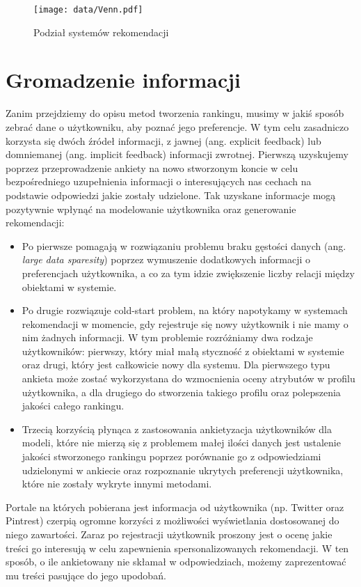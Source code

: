 \begin{figure}[h]
    \centering
    \texttt{[image: data/Venn.pdf]}
    \caption{Podział systemów rekomendacji}
    \label{fig:my_label}
\end{figure}

\section{Gromadzenie informacji}

Zanim przejdziemy do opisu metod tworzenia rankingu, musimy w jakiś sposób zebrać dane o użytkowniku, aby poznać jego preferencje. W tym celu zasadniczo korzysta się dwóch źródeł informacji, z jawnej (ang. explicit feedback) lub domniemanej  (ang. implicit feedback) informacji zwrotnej. Pierwszą uzyskujemy poprzez przeprowadzenie ankiety na nowo stworzonym koncie w celu bezpośredniego uzupełnienia informacji o interesujących nas cechach na podstawie odpowiedzi jakie zostały udzielone. Tak uzyskane informacje mogą pozytywnie wpłynąć na modelowanie użytkownika oraz generowanie rekomendacji:
\begin{itemize}
    \item Po pierwsze pomagają w rozwiązaniu problemu braku gęstości danych (ang. \textit{large data sparesity}) poprzez wymuszenie dodatkowych informacji o preferencjach użytkownika, a co za tym idzie zwiększenie liczby relacji między obiektami w systemie.
    \item Po drugie rozwiązuje cold-start problem, na który napotykamy w systemach rekomendacji w momencie, gdy rejestruje się nowy użytkownik i nie mamy o nim żadnych informacji. W tym problemie rozróżniamy dwa rodzaje użytkowników: pierwszy, który miał małą styczność z obiektami w systemie oraz drugi, który jest całkowicie nowy dla systemu. Dla pierwszego typu ankieta może zostać wykorzystana do wzmocnienia oceny atrybutów w profilu użytkownika, a dla drugiego do stworzenia takiego profilu oraz polepszenia jakości całego rankingu.
    \item Trzecią korzyścią płynąca z zastosowania ankietyzacja użytkowników dla modeli, które nie mierzą się z problemem małej ilości danych jest ustalenie jakości stworzonego rankingu poprzez porównanie go z odpowiedziami udzielonymi w ankiecie oraz rozpoznanie ukrytych preferencji użytkownika, które nie zostały wykryte innymi metodami. \cite{RecommenderSystemsBasedonUserReviews:TheStateoftheArt}
\end{itemize}

Portale na których pobierana jest informacja od użytkownika (np. Twitter oraz Pintrest) czerpią ogromne korzyści z możliwości wyświetlania dostosowanej do niego zawartości. 
Zaraz po rejestracji użytkownik proszony jest o ocenę jakie treści go interesują w celu zapewnienia spersonalizowanych rekomendacji. W ten sposób, o ile ankietowany nie skłamał w odpowiedziach, możemy zaprezentować mu treści pasujące do jego upodobań.

